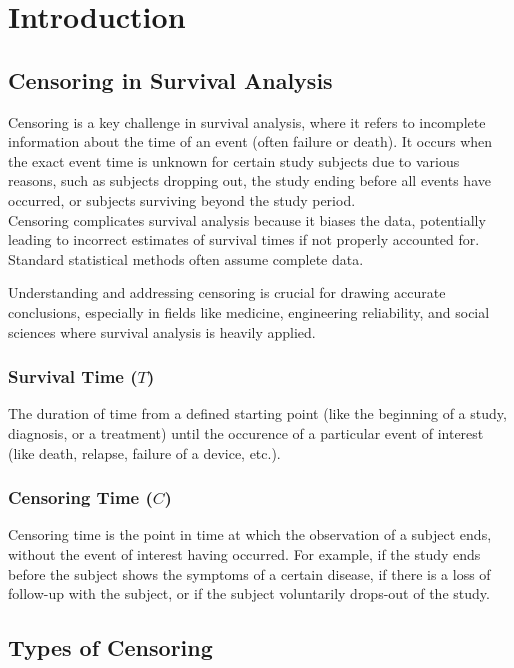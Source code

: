 \section{Introduction}

\subsection{Censoring in Survival Analysis}
\normalsize{
Censoring is a key challenge in survival analysis, where it refers to incomplete information about the time of an event (often failure or death). It occurs when the exact event time is unknown for certain study subjects due to various reasons, such as subjects dropping out, the study ending before all events have occurred, or subjects surviving beyond the study period.\\
Censoring complicates survival analysis because it biases the data, potentially leading to incorrect estimates of survival times if not properly accounted for. Standard statistical methods often assume complete data.

Understanding and addressing censoring is crucial for drawing accurate conclusions, especially in fields like medicine, engineering reliability, and social sciences where survival analysis is heavily applied.
}
\subsubsection{Survival Time ($T$)}
\normalsize {
The duration of time from a defined starting point (like the beginning of a study, diagnosis, or a treatment) until the occurence of a particular event of interest (like death, relapse, failure of a device, etc.).
}

\subsubsection{Censoring Time ($C$)}
\normalsize {
Censoring time is the point in time at which the observation of a subject ends, without the event of interest having occurred. For example, if the study ends before the subject shows the symptoms of a certain disease, if there is a loss of follow-up with the subject, or if the subject voluntarily drops-out of the study. 
}

\subsection{Types of Censoring}
